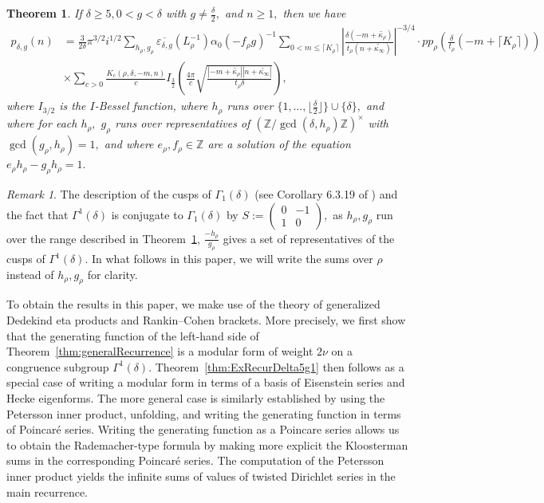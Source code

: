 \documentclass[10pt]{amsart}
\newtheorem{theorem}{Theorem}[section]
\theoremstyle{definition}
\theoremstyle{remark}
\newtheorem*{remark}{Remark}
\numberwithin{equation}{section}
\newcommand{\Z}{\mathbb Z}
\begin{document}
	\begin{theorem}\label{thm:Rademacher}
		If $\delta\geq 5, 0<g<\delta$ with $g\neq\frac{\delta}{2},$ and $n\geq 1,$ then we have
		\begin{align*}
		p_{\delta,g}(n)&=\frac{3}{2\delta}\pi^{3/2}i^{1/2}\sum\limits_{h_\rho,g_\rho}\overline{\varepsilon_{\delta,g}}(L_\rho^{-1})\alpha_0(-f_\rho g)^{-1}\sum\limits_{0< m\leq \lceil K_\rho\rceil}\left|\frac{\delta(-m+\widetilde{\kappa_\rho})}{t_\rho(n+\widetilde{\kappa_\infty})}\right|^{-3/4}\cdot pp_\rho\left(\frac{\delta}{t_\rho}(-m+\lceil K_\rho\rceil)\right)\\
		&\times\sum\limits_{c>0}\frac{K_c(\rho,\delta,-m,n)}{c}I_{\frac{3}{2}}\left(\frac{4\pi}{c}\sqrt{\frac{|-m+\widetilde{\kappa_\rho}||n+\widetilde{\kappa_\infty}|}{t_\rho\delta}}\right),
		\end{align*}
		where $I_{3/2}$ is the $I$-Bessel function, where $h_\rho$ runs over $\{1,\ldots,\lfloor\frac{\delta}{2}\rfloor\}\cup\{\delta\},$ and where for each $h_\rho,$  $g_\rho$ runs over representatives of $(\Z/\gcd(\delta,h_\rho)\Z)^\times$ with $\gcd(g_\rho,h_\rho)=1,$ and where $e_\rho, f_\rho\in\Z$ are a solution of the equation $e_\rho h_\rho-g_\rho h_\rho=1.$
	\end{theorem}
	
	\begin{remark}
		The description of the cusps of $\Gamma_1(\delta)$ (see Corollary 6.3.19 of \cite{Stromberg}) and the fact that $\Gamma^1(\delta)$ is conjugate to $\Gamma_1(\delta)$ by $S:=\begin{pmatrix}
			0 & -1 \\
			1 & 0
		\end{pmatrix},$ as $h_\rho,g_\rho$ run over the range described in Theorem~\ref{thm:Rademacher}, $\frac{-h_\rho}{g_\rho}$ gives a set of representatives of the cusps of $\Gamma^1(\delta).$ In what follows in this paper, we will write the sums over $\rho$ instead of $h_\rho,g_\rho$ for clarity.
	\end{remark}
	
	To obtain the results in this paper, we make use of the theory of generalized Dedekind eta products and Rankin--Cohen brackets. More precisely, we first show that the generating function of the left-hand side of Theorem~\ref{thm:generalRecurrence} is a modular form of weight $2\nu$ on a congruence subgroup $\Gamma^1(\delta).$ Theorem~\ref{thm:ExRecurDelta5g1} then follows as a special case of writing a modular form in terms of a basis of Eisenstein series and Hecke eigenforms. The more general case is similarly established by using the Petersson inner product, unfolding, and writing the generating function in terms of Poincar\'e series. Writing the generating function as a Poincare series allows us to obtain the Rademacher-type formula by making more explicit the Kloosterman sums in the corresponding Poincar\'e series. The computation of the Petersson inner product yields the infinite sums of values of twisted Dirichlet series in the main recurrence.
	
\end{document}
